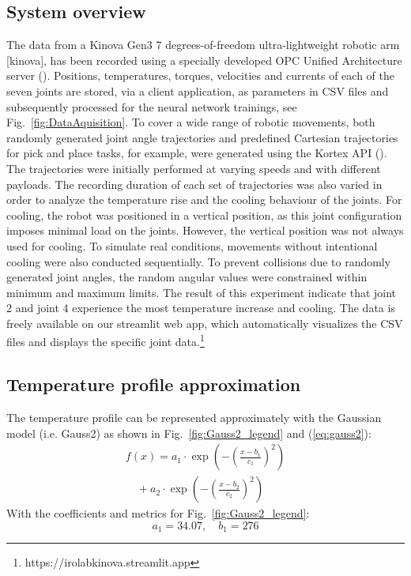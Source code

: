 \documentclass{ifacconf}
\begin{document}
\subsection{System overview}
The data from a Kinova Gen3 7 degrees-of-freedom ultra-lightweight robotic arm [kinova], has been recorded using a specially developed OPC Unified Architecture server (\cite{Girke}). 
Positions, temperatures, torques, velocities and currents of each of the seven joints are stored, via a client application, as parameters in CSV files and subsequently processed for the neural network trainings, see Fig.~\ref{fig:DataAquisition}.
To cover a wide range of robotic movements, both randomly generated joint angle trajectories and predefined Cartesian trajectories for pick and place tasks, for example, were generated using the Kortex API (\cite{kortexAPI}). 
The trajectories were initially performed at varying speeds and with different payloads. The recording duration of each set of trajectories was also varied in order to analyze the temperature rise and the cooling behaviour of the joints. 
For cooling, the robot was positioned in a vertical position, as this joint configuration imposes minimal load on the joints. However, the vertical position was not always used for cooling. To simulate real conditions, movements without intentional cooling were also conducted sequentially.
To prevent collisions due to randomly generated joint angles, the random angular values were constrained within minimum and maximum limits. 
The result of this experiment indicate that joint 2 and joint 4 experience the most temperature increase and cooling. The data is freely available on our streamlit web app, 
which automatically visualizes the CSV files and displays the specific joint data.\footnote{https://irolabkinova.streamlit.app}  

\subsection{Temperature profile approximation}
The temperature profile can be represented approximately with the Gaussian model (i.e. Gauss2) as shown in Fig.~\ref{fig:Gauss2_legend} and (\ref{eq:gauss2}):
\begin{equation} \label{eq:gauss2}
  \begin{array}{l}
  f(x) = a_1 \cdot \exp\left( -\left( \frac{x - b_1}{c_1} \right)^2 \right) \\
  \quad + a_2 \cdot \exp\left( -\left( \frac{x - b_2}{c_2} \right)^2 \right)
  \end{array}
  \end{equation}
With the coefficients and metrics for Fig.~\ref{fig:Gauss2_legend}:
\[
a_1 = 34.07, \quad b_1 = 276 
\]
\end{document}
